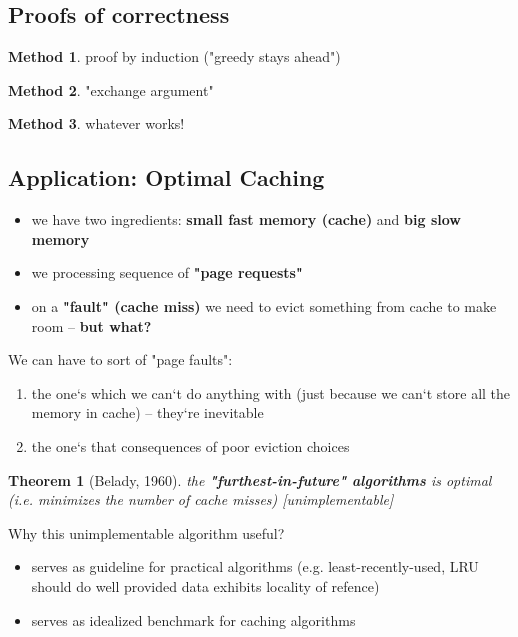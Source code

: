 \documentclass[a4paper,12pt]{article}
\theoremstyle{plain}
\newtheorem*{theorem}{Theorem}
\theoremstyle{definition}
\newtheorem{method}{Method}[subsection]
\theoremstyle{remark}
\begin{document}
\subsection{Proofs of correctness}
\begin{method}proof by induction ("greedy stays ahead")\end{method}
\begin{method}"exchange argument"\end{method}
\begin{method}whatever works!\end{method}



\subsection{Application: Optimal Caching}
\begin{itemize}
\item we have two ingredients: \textbf{small fast memory (cache)} and \textbf{big slow memory}
\item we processing sequence of \textbf{"page requests"}
\item on a \textbf{"fault" (cache miss)} we need to evict something from cache to make room -- \textbf{but what?}
\end{itemize}

We can have to sort of "page faults":
\begin{enumerate}
\item the one`s which we can`t do anything with (just because we can`t store all the memory in cache) -- they`re inevitable
\item the one`s that consequences of poor eviction choices
\end{enumerate}

\begin{theorem} [Belady, 1960] the \textbf{"furthest-in-future" algorithms} is optimal (i.e. minimizes the number of cache misses) [unimplementable] \end{theorem}

Why this unimplementable algorithm useful?
\begin{itemize}
\item serves as guideline for practical algorithms (e.g. least-recently-used, LRU should do well provided data exhibits locality of refence)
\item serves as idealized benchmark for caching algorithms
\end{itemize}
\end{document}
